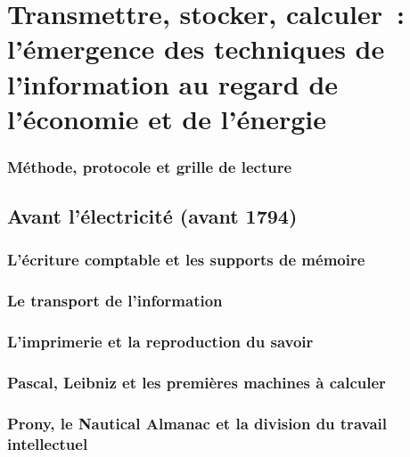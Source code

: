
\chapter{Transmettre, stocker, calculer~: l'émergence des techniques de l'information au regard de l'économie et de l'énergie}\label{ch:history}

\subsection*{Méthode, protocole et grille de lecture}\label{subsec:grammaire}


\section{Avant l'électricité (avant 1794)}\label{sec:era0}

\subsection{L'écriture comptable et les supports de mémoire}\label{subsec:ecriture}

\subsection{Le transport de l'information}\label{subsec:transport}

\subsection{L'imprimerie et la reproduction du savoir}\label{subsec:imprimerie}

\subsection{Pascal, Leibniz et les premières machines à calculer}\label{subsec:pascaline}

\subsection{Prony, le Nautical Almanac et la division du travail intellectuel}\label{subsec:prony}

